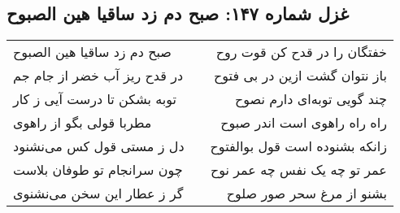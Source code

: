\begin{center}
\section*{غزل شماره ۱۴۷: صبح دم زد ساقیا هین الصبوح}
\label{sec:147}
\begin{longtable}{l p{0.5cm} r}
صبح دم زد ساقیا هین الصبوح
&&
خفتگان را در قدح کن قوت روح
\\
در قدح ریز آب خضر از جام جم
&&
باز نتوان گشت ازین در بی فتوح
\\
توبه بشکن تا درست آیی ز کار
&&
چند گویی توبه‌ای دارم نصوح
\\
مطربا قولی بگو از راهوی
&&
راه راه راهوی است اندر صبوح
\\
دل ز مستی قول کس می‌نشنود
&&
زانکه بشنوده است قول بوالفتوح
\\
چون سرانجام تو طوفان بلاست
&&
عمر تو چه یک نفس چه عمر نوح
\\
گر ز عطار این سخن می‌نشنوی
&&
بشنو از مرغ سحر صور صلوح
\\
\end{longtable}
\end{center}
